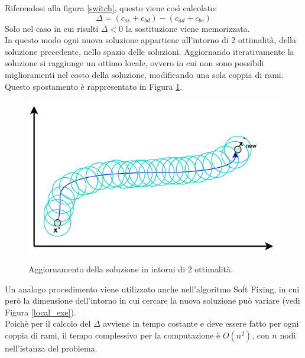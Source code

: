 Riferendosi alla figura \ref{switch}, questo viene così calcolato:\\
 $$\Delta = (c_{ac} + c_{bd}) - (c_{ad} + c_{bc})$$
 Solo nel caso in cui risulti $\Delta < 0$ la sostituzione viene memorizzata.\\
In questo modo ogni nuova soluzione appartiene all'intorno di 2 ottimalità, della soluzione precedente, nello spazio delle soluzioni. Aggiornando iterativamente la soluzione si raggiunge un ottimo locale, ovvero in cui non sono possibili miglioramenti nel costo della soluzione, modificando una sola coppia di rami. Questo spostamento è rappresentato in Figura \ref{two_optimality}. 
\begin{figure}[h] 
\begin{center} 
  \includegraphics[scale=0.4]{Images/two_optimality}\\ 
  \caption{\footnotesize{Aggiornamento della soluzione in intorni di 2 ottimalità.}}
  \label{two_optimality}
\end{center}
\end{figure}
Un analogo procedimento viene utilizzato anche nell'algoritmo Soft Fixing, in cui però la dimensione dell'intorno in cui cercare la nuova soluzione può variare (vedi Figura \ref{local_exe}).\\
Poichè per il calcolo del $\Delta$ avviene in tempo costante e deve essere fatto per ogni coppia di rami, il tempo complessivo per la computazione è $O(n^2)$, con $n$ nodi nell'istanza del problema.
